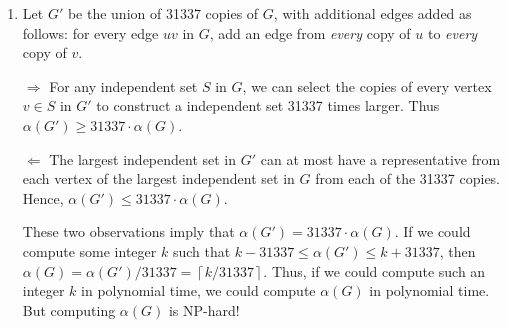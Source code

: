 \documentclass[14pt]{extreport}
\begin{document}
\begin{enumerate}
        \vspace{3mm}
        \textcolor{ForestGreen!80}{Note: You can also do this from a reduction from computing $\chi(G)$:}
        
        \vspace{3mm}
        \textcolor{ForestGreen!80}{
        ``If we could compute some integer \( k \) such that \( k \leq \chi(G') \leq k + 473  \), then \( \chi(G) = \chi(G')/473 = \left\lceil k/473 \right\rceil \). Thus, if we could compute such an integer \( k \) in polynomial time, we could compute \( \chi(G) \) in polynomial time. But computing \( \chi(G) \) is \textsf{NP-hard!}"}
        
        \item Let $G'$ be the union of 31337 copies of $G$, with additional edges added as follows: for every edge $uv$ in $G$, add an edge from \textit{every} copy of $u$ to \textit{every} copy of $v$.

        \vspace{3mm}
        \(\Longrightarrow\) For any independent set $S$ in $G$, we can select the copies of every vertex $v \in S$ in $G'$ to construct a independent set 31337 times larger. Thus $\alpha(G') \ge 31337 \cdot \alpha(G)$.

        \vspace{3mm}
        \(\Longleftarrow\) The largest independent set in $G'$ can at most have a representative from each vertex of the largest independent set in $G$ from each of the 31337 copies. Hence, $\alpha(G') \le 31337 \cdot \alpha(G)$.
        
        \vspace{3mm}
        These two observations imply that \( \alpha(G') = 31337 \cdot \alpha(G) \). If we could compute some integer \( k \) such that \( k - 31337 \leq \alpha(G') \leq k + 31337 \), then \( \alpha(G) = \alpha(G')/31337 = \left\lceil k/31337 \right\rceil \). Thus, if we could compute such an integer \( k \) in polynomial time, we could compute \( \alpha(G) \) in polynomial time. But computing \( \alpha(G) \) is \textsf{NP-hard!}
    \end{enumerate}


\end{document}
